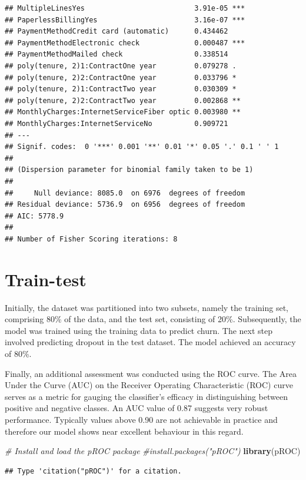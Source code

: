 \documentclass[
]{article}
\newenvironment{Shaded}{\begin{snugshade}}{\end{snugshade}}
\newcommand{\CommentTok}[1]{\textcolor[rgb]{0.56,0.35,0.01}{\textit{#1}}}
\newcommand{\FunctionTok}[1]{\textcolor[rgb]{0.13,0.29,0.53}{\textbf{#1}}}
\newcommand{\NormalTok}[1]{#1}
\begin{document}
\begin{verbatim}
## MultipleLinesYes                          3.91e-05 ***
## PaperlessBillingYes                       3.16e-07 ***
## PaymentMethodCredit card (automatic)      0.434462    
## PaymentMethodElectronic check             0.000487 ***
## PaymentMethodMailed check                 0.338514    
## poly(tenure, 2)1:ContractOne year         0.079278 .  
## poly(tenure, 2)2:ContractOne year         0.033796 *  
## poly(tenure, 2)1:ContractTwo year         0.030309 *  
## poly(tenure, 2)2:ContractTwo year         0.002868 ** 
## MonthlyCharges:InternetServiceFiber optic 0.003980 ** 
## MonthlyCharges:InternetServiceNo          0.909721    
## ---
## Signif. codes:  0 '***' 0.001 '**' 0.01 '*' 0.05 '.' 0.1 ' ' 1
## 
## (Dispersion parameter for binomial family taken to be 1)
## 
##     Null deviance: 8085.0  on 6976  degrees of freedom
## Residual deviance: 5736.9  on 6956  degrees of freedom
## AIC: 5778.9
## 
## Number of Fisher Scoring iterations: 8
\end{verbatim}

\hypertarget{train-test}{%
\section{Train-test}\label{train-test}}

Initially, the dataset was partitioned into two subsets, namely the
training set, comprising 80\% of the data, and the test set, consisting
of 20\%. Subsequently, the model was trained using the training data to
predict churn. The next step involved predicting dropout in the test
dataset. The model achieved an accuracy of 80\%.

Finally, an additional assessment was conducted using the ROC curve. The
Area Under the Curve (AUC) on the Receiver Operating Characteristic
(ROC) curve serves as a metric for gauging the classifier's efficacy in
distinguishing between positive and negative classes. An AUC value of
0.87 suggests very robust performance. Typically values above 0.90 are
not achievable in practice and therefore our model shows near excellent
behaviour in this regard.

\begin{Shaded}
\begin{Highlighting}[]
\CommentTok{\# Install and load the pROC package}
\CommentTok{\#install.packages("pROC")}
\FunctionTok{library}\NormalTok{(pROC)}
\end{Highlighting}
\end{Shaded}

\begin{verbatim}
## Type 'citation("pROC")' for a citation.
\end{verbatim}
\end{document}
